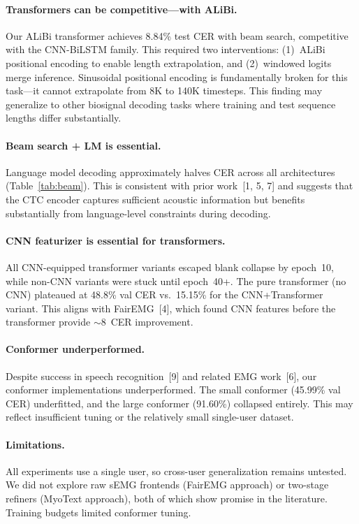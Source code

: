 \documentclass{article}
\begin{document}
\paragraph{Transformers can be competitive---with ALiBi.} Our ALiBi transformer achieves 8.84\% test CER with beam search, competitive with the CNN-BiLSTM family. This required two interventions: (1)~ALiBi positional encoding to enable length extrapolation, and (2)~windowed logits merge inference. Sinusoidal positional encoding is fundamentally broken for this task---it cannot extrapolate from 8K to 140K timesteps. This finding may generalize to other biosignal decoding tasks where training and test sequence lengths differ substantially.

\paragraph{Beam search + LM is essential.} Language model decoding approximately halves CER across all architectures (Table~\ref{tab:beam}). This is consistent with prior work~[1, 5, 7] and suggests that the CTC encoder captures sufficient acoustic information but benefits substantially from language-level constraints during decoding.

\paragraph{CNN featurizer is essential for transformers.} All CNN-equipped transformer variants escaped blank collapse by epoch~10, while non-CNN variants were stuck until epoch~40+. The pure transformer (no CNN) plateaued at 48.8\% val CER vs.\ 15.15\% for the CNN+Transformer variant. This aligns with FairEMG~[4], which found CNN features before the transformer provide ${\sim}$8~CER improvement.

\paragraph{Conformer underperformed.} Despite success in speech recognition~[9] and related EMG work~[6], our conformer implementations underperformed. The small conformer (45.99\% val CER) underfitted, and the large conformer (91.60\%) collapsed entirely. This may reflect insufficient tuning or the relatively small single-user dataset.

\paragraph{Limitations.} All experiments use a single user, so cross-user generalization remains untested. We did not explore raw sEMG frontends (FairEMG approach) or two-stage refiners (MyoText approach), both of which show promise in the literature. Training budgets limited conformer tuning.
\end{document}
